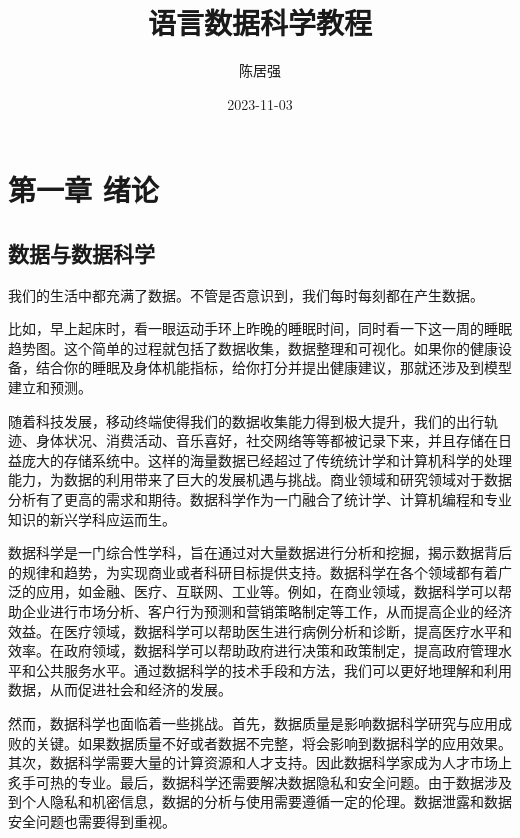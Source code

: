 \documentclass[]{book}
\title{语言数据科学教程}
\author{陈居强}
\date{2023-11-03}
\begin{document}
\maketitle

{
\setcounter{tocdepth}{1}
\tableofcontents
}
\hypertarget{ux7b2cux4e00ux7ae0-ux7eeaux8bba}{%
\chapter{第一章 绪论}\label{ux7b2cux4e00ux7ae0-ux7eeaux8bba}}



\hypertarget{ux6570ux636eux4e0eux6570ux636eux79d1ux5b66}{%
\section{数据与数据科学}\label{ux6570ux636eux4e0eux6570ux636eux79d1ux5b66}}

我们的生活中都充满了数据。不管是否意识到，我们每时每刻都在产生数据。

比如，早上起床时，看一眼运动手环上昨晚的睡眠时间，同时看一下这一周的睡眠趋势图。这个简单的过程就包括了数据收集，数据整理和可视化。如果你的健康设备，结合你的睡眠及身体机能指标，给你打分并提出健康建议，那就还涉及到模型建立和预测。

随着科技发展，移动终端使得我们的数据收集能力得到极大提升，我们的出行轨迹、身体状况、消费活动、音乐喜好，社交网络等等都被记录下来，并且存储在日益庞大的存储系统中。这样的海量数据已经超过了传统统计学和计算机科学的处理能力，为数据的利用带来了巨大的发展机遇与挑战。商业领域和研究领域对于数据分析有了更高的需求和期待。数据科学作为一门融合了统计学、计算机编程和专业知识的新兴学科应运而生。

数据科学是一门综合性学科，旨在通过对大量数据进行分析和挖掘，揭示数据背后的规律和趋势，为实现商业或者科研目标提供支持。数据科学在各个领域都有着广泛的应用，如金融、医疗、互联网、工业等。例如，在商业领域，数据科学可以帮助企业进行市场分析、客户行为预测和营销策略制定等工作，从而提高企业的经济效益。在医疗领域，数据科学可以帮助医生进行病例分析和诊断，提高医疗水平和效率。在政府领域，数据科学可以帮助政府进行决策和政策制定，提高政府管理水平和公共服务水平。通过数据科学的技术手段和方法，我们可以更好地理解和利用数据，从而促进社会和经济的发展。

然而，数据科学也面临着一些挑战。首先，数据质量是影响数据科学研究与应用成败的关键。如果数据质量不好或者数据不完整，将会影响到数据科学的应用效果。其次，数据科学需要大量的计算资源和人才支持。因此数据科学家成为人才市场上炙手可热的专业。最后，数据科学还需要解决数据隐私和安全问题。由于数据涉及到个人隐私和机密信息，数据的分析与使用需要遵循一定的伦理。数据泄露和数据安全问题也需要得到重视。
\end{document}
